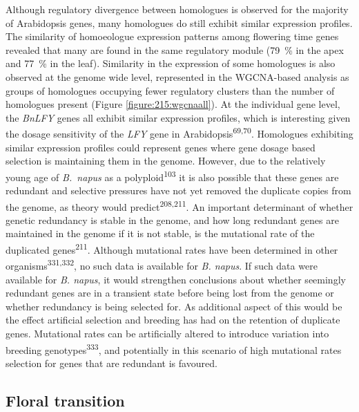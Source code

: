 \documentclass[12pt,]{book}
\begin{document}
Although regulatory divergence between homologues is observed for the
majority of Arabidopsis genes, many homologues do still exhibit similar
expression profiles. The similarity of homoeologue expression patterns
among flowering time genes revealed that many are found in the same
regulatory module (79~\% in the apex and 77~\% in the leaf). Similarity
in the expression of some homologues is also observed at the genome wide
level, represented in the WGCNA-based analysis as groups of homologues
occupying fewer regulatory clusters than the number of homologues
present (Figure \ref{figure:215:wgcnaall}). At the individual gene
level, the \emph{BnLFY} genes all exhibit similar expression profiles,
which is interesting given the dosage sensitivity of the \emph{LFY} gene
in Arabidopsis\textsuperscript{69,70}. Homologues exhibiting similar
expression profiles could represent genes where gene dosage based
selection is maintaining them in the genome. However, due to the
relatively young age of \emph{B.~napus} as a
polyploid\textsuperscript{103} it is also possible that these genes are
redundant and selective pressures have not yet removed the duplicate
copies from the genome, as theory would
predict\textsuperscript{208,211}. An important determinant of whether
genetic redundancy is stable in the genome, and how long redundant genes
are maintained in the genome if it is not stable, is the mutational rate
of the duplicated genes\textsuperscript{211}. Although mutational rates
have been determined in other organisms\textsuperscript{331,332}, no
such data is available for \emph{B. napus}. If such data were available
for \emph{B. napus}, it would strengthen conclusions about whether
seemingly redundant genes are in a transient state before being lost
from the genome or whether redundancy is being selected for. As
additional aspect of this would be the effect artificial selection and
breeding has had on the retention of duplicate genes. Mutational rates
can be artificially altered to introduce variation into breeding
genotypes\textsuperscript{333}, and potentially in this scenario of high
mutational rates selection for genes that are redundant is favoured.

\subsection{Floral transition}\label{floral-transition}
\end{document}
